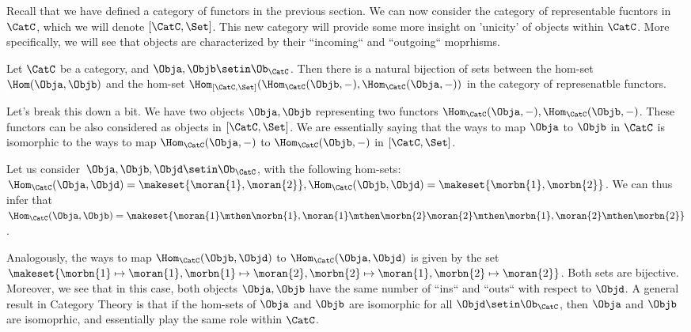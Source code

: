 Recall that we have defined a category of functors in the previous section.
We can now consider the category of representable fucntors in $\CatC$, which we will denote $[\CatC, \Set]$.
This new category will provide some more insight on 'unicity' of objects within $\CatC$.
More specifically, we will see that objects are characterized by their ``incoming`` and ``outgoing`` moprhisms.

\begin{theorem}
    Let $\CatC$ be a category, and $\Obja, \Objb \setin \Ob_\CatC$.
    Then there is a natural bijection of sets between the hom-set $\Hom(\Obja,\Objb)$ and the hom-set  $\Hom_{[\CatC, \Set]}(\Hom_\CatC(\Objb, -), \Hom_\CatC(\Obja, -))$ in the category of represenatble functors.
\end{theorem}
Let's break this down a bit.
We have two objects $\Obja, \Objb$ representing two functors $\Hom_\CatC(\Obja,-), \Hom_\CatC(\Objb,-)$.
These functors can be also considered as objects in $[\CatC, \Set]$.
We are essentially saying that the ways to map $\Obja$ to $\Objb$ in $\CatC$ is isomorphic to the ways to map $\Hom_\CatC(\Obja,-)$ to $ \Hom_\CatC(\Objb,-)$ in $[\CatC, \Set]$.

\begin{example}
    \begin{marginfigure}
        \centering
        \caption{\label{fig:rep-functor-1}}
    \end{marginfigure}

    \begin{marginfigure}
        \centering
        \caption{\label{fig:rep-functor-2}}
    \end{marginfigure}
    Let us consider~$\Obja, \Objb, \Objd \setin \Ob_\CatC$, with the following hom-sets: $\Hom_\CatC(\Obja, \Objd) = \makeset{\moran{1},\moran{2}}, \Hom_\CatC(\Objb, \Objd) = \makeset{\morbn{1},\morbn{2}}$.
    We can thus infer that $\Hom_\CatC(\Obja, \Objb) = \makeset{\moran{1}\mthen\morbn{1}, \moran{1}\mthen\morbn{2} \moran{2}\mthen\morbn{1}, \moran{2}\mthen\morbn{2}}$.

    Analogously, the ways to map $\Hom_\CatC(\Objb, \Objd)$ to $\Hom_\CatC(\Obja, \Objd)$ is given by the set $\makeset{\morbn{1} \mapsto \moran{1}, \morbn{1} \mapsto \moran{2}, \morbn{2} \mapsto \moran{1}, \morbn{2} \mapsto \moran{2}}$.
    Both sets are bijective.
    Moreover, we see that in this case, both objects $\Obja, \Objb$ have the same number of ``ins`` and ``outs`` with respect to $\Objd$.
    A general result in Category Theory is that if the hom-sets of $\Obja$ and $\Objb$ are isomorphic for all $\Objd \setin \Ob_\CatC$, then $\Obja$ and $\Objb$ are isomoprhic, and essentially play the same role within $\CatC$.
\end{example}

